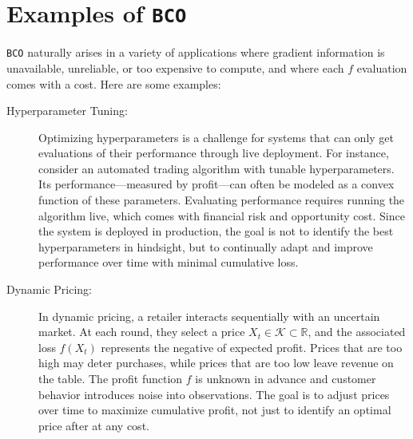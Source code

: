 \documentclass[letter, 12pt]{report}
\newcommand{\R}{\mathbb R}
\newcommand{\cK}{\mathcal K}
\newcommand{\1}{\mathbf{1}}
\newcommand{\bco}{\texttt{BCO}\xspace}
\theoremstyle{plain}
\theoremstyle{definition}
\theoremstyle{remark}
\begin{document}
\section{Examples of \bco}
\bco naturally arises in a variety of applications where gradient information is unavailable, unreliable, or too expensive to compute, and where each $f$ evaluation comes with a cost. Here are some examples:
\begin{description}

    \item[\textcolor{dkblue}{Hyperparameter Tuning:}]
          Optimizing hyperparameters is a challenge for systems that can only get evaluations of their performance through live deployment.
          For instance, consider an automated trading algorithm with tunable hyperparameters.
          Its performance—measured by profit—can often be modeled as a convex function of these parameters.
          Evaluating performance requires running the algorithm live, which comes with financial risk and opportunity cost.
          Since the system is deployed in production, the goal is not to identify the best hyperparameters in hindsight, but to continually adapt and improve performance over time with minimal cumulative loss.

    \item[\textcolor{dkblue}{Dynamic Pricing:}]
          In dynamic pricing, a retailer interacts sequentially with an uncertain market.
          At each round, they select a price \(X_t \in \cK \subset \R\), and the associated loss \(f(X_t)\) represents the negative of expected profit.
          Prices that are too high may deter purchases, while prices that are too low leave revenue on the table.
          The profit function \(f\) is unknown in advance and customer behavior introduces noise into observations.
          The goal is to adjust prices over time to maximize cumulative profit, not just to identify an optimal price after at any cost.


\end{description}
\end{document}
